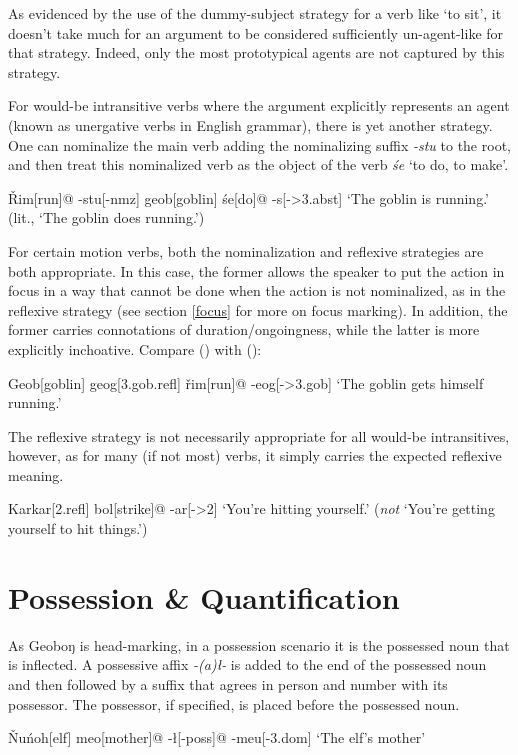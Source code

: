 \documentclass[a4paper,11pt,oneside,openany]{memoir}
\newcommand{\vr}{ř}
\newcommand{\vR}{Ř}
\newcommand{\vN}{Ň}
\newcommand{\engma}{ŋ}
\begin{document}
As evidenced by the use of the dummy-subject strategy for a verb like `to sit', it doesn't take much for an argument to be considered sufficiently un-agent-like for that strategy. Indeed, only the most prototypical agents are not captured by this strategy.

For would-be intransitive verbs where the argument explicitly represents an agent (known as unergative verbs in English grammar), there is yet another strategy. One can nominalize the main verb adding the nominalizing suffix \textit{-stu} to the root, and then treat this nominalized verb as the object of the verb \textit{\'se} `to do, to make'.

\ex
\begingl
\vR im[run]@
-stu[\sc -nmz]
geob[goblin]
\'se[do]@
-s[\sc ->3.abst]
\glft  `The goblin is running.' (lit., `The goblin does running.')
\endgl
\xe

For certain motion verbs, both the nominalization and reflexive strategies are both appropriate. In this case, the former allows the speaker to put the action in focus in a way that cannot be done when the action is not nominalized, as in the reflexive strategy (see section \ref{focus} for more on focus marking). In addition, the former carries connotations of duration/ongoingness, while the latter is more explicitly inchoative. Compare (\lastx) with (\nextx):

\ex
\begingl
Geob[goblin]
geog[\sc 3.gob.refl]
\vr im[run]@
-eog[\sc ->3.gob]
\glft `The goblin gets himself running.'
\endgl
\xe

The reflexive strategy is not necessarily appropriate for all would-be intransitives, however, as for many (if not most) verbs, it simply carries the expected reflexive meaning.

\ex
\begingl
Karkar[\sc 2.refl]
bol[strike]@
-ar[\sc ->2]
\glft  `You're hitting yourself.' (\emph{not} `You're getting yourself to hit things.')
\endgl
\xe

\section{Possession \& Quantification}

As Geobo{\engma} is head-marking, in a possession scenario it is the possessed noun that is inflected. A possessive affix \textit{-(a)\l-} is added to the end of the possessed noun and then followed by a suffix that agrees in person and number with its possessor. The possessor, if specified, is placed before the possessed noun.

\ex
\begingl
\vN u\'noh[elf]
meo[mother]@
-\l[\sc -poss]@
-meu[\sc -3.dom]
\glft  `The elf's mother'
\endgl
\xe
\end{document}
